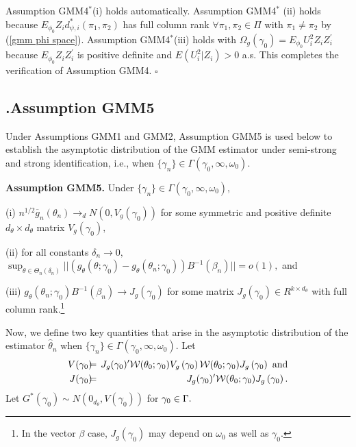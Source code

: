 \documentclass[12pt,titlepage,final,oneside,letterpaper]{article}
\begin{document}
Assumption GMM4$^{\ast }$(i) holds automatically. Assumption GMM4$^{\ast }$%
(ii) holds because $E_{\phi _{0}}Z_{i}d_{\psi ,i}^{\ast }(\pi _{1},\pi _{2})$
has full column rank $\forall \pi _{1},\pi _{2}\in \Pi $ with $\pi _{1}\neq
\pi _{2}$ by (\ref{gmm phi space}). Assumption GMM4$^{\ast }$(iii) holds
with $\Omega _{g}(\gamma _{0})=E_{\phi _{0}}U_{i}^{2}Z_{i}Z_{i}^{\prime }$
because $E_{\phi _{0}}Z_{i}Z_{i}^{\prime }$ is positive definite and $%
E(U_{i}^{2}|Z_{i})>0$ a.s. This completes the verification of Assumption
GMM4. $\square $

\subsection{\hspace{-0.23in}\textbf{.}\hspace{0.18in}Assumption GMM5}

\hspace{0.25in}Under Assumptions GMM1 and GMM2, Assumption GMM5 is used
below to establish the asymptotic distribution of the GMM estimator under
semi-strong and strong identification, i.e., when $\{\gamma _{n}\}\in \Gamma
(\gamma _{0},\infty ,\omega _{0}).$\medskip

\noindent \textbf{Assumption GMM5. }Under $\{\gamma _{n}\}\in \Gamma (\gamma
_{0},\infty ,\omega _{0}),$

\noindent (i) $n^{1/2}\overline{g}_{n}(\theta _{n})\rightarrow
_{d}N(0,V_{g}(\gamma _{0}))$ for some symmetric and positive definite $%
d_{\theta }\times d_{\theta }$ matrix $V_{g}(\gamma _{0}),$

\noindent (ii) for all constants $\delta _{n}\rightarrow 0,$ $\sup_{\theta
\in \Theta _{n}\left( \delta _{n}\right) }||(g_{\theta }(\theta ;\gamma
_{0})-g_{\theta }(\theta _{n};\gamma _{0}))B^{-1}(\beta _{n})||=o(1),$ and

\noindent (iii) $g_{\theta }(\theta _{n};\gamma _{0})B^{-1}(\beta
_{n})\rightarrow J_{g}(\gamma _{0})$ for some matrix $J_{g}(\gamma _{0})\in
R^{k\times d_{\theta }}$ with full column rank.\footnote{%
In the vector $\beta $ case, $J_{g}(\gamma _{0})$ may depend on $\omega _{0}$
as well as $\gamma _{0}.$}\medskip

Now, we define two key quantities that arise in the asymptotic distribution
of the estimator $\widehat{\theta }_{n}$ when $\{\gamma _{n}\}\in \Gamma
(\gamma _{0},\infty ,\omega _{0}).$ Let%
\begin{eqnarray}
V(\gamma _{0})\hspace{-0.08in} &=&\hspace{-0.08in}J_{g}(\gamma _{0})^{\prime
}\mathcal{W}(\theta _{0};\gamma _{0})V_{g}\left( \gamma _{0}\right) \mathcal{%
W}(\theta _{0};\gamma _{0})J_{g}\left( \gamma _{0}\right) \text{ and}  \notag
\\
J(\gamma _{0})\hspace{-0.08in} &=&\hspace{-0.08in}J_{g}(\gamma _{0})^{\prime
}\mathcal{W}(\theta _{0};\gamma _{0})J_{g}\left( \gamma _{0}\right) .
\label{J and V Matrices}
\end{eqnarray}%
Let $G^{\ast }(\gamma _{0})\sim N(0_{d_{\theta }},V(\gamma _{0}))$ for $%
\gamma _{0}\in \Gamma .\medskip $
\end{document}
